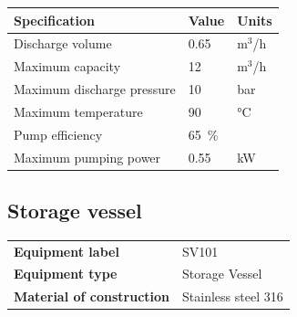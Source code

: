 \begin{table}[H]
\centering
\begin{tabular}{@{}l|l|l@{}}
\toprule
\textbf{Specification}                    & \textbf{Value} & \textbf{Units} \\ \midrule
Discharge volume                              & 0.65            & m$^3$/h            \\ \midrule
Maximum capacity                  & 12       &  m$^3$/h       \\ \midrule
Maximum discharge pressure       & 10         &     bar           \\ \midrule
Maximum temperature                  & 90     & °C         \\ \midrule
Pump efficiency \cite{pumps_and_systems_magazine_pump_2012}               & \SI{65}{\percent}         &            \\ \midrule
Maximum pumping power                     & 0.55     & kW           \\ \bottomrule
\end{tabular}
\end{table}

\newpage
\subsection{Storage vessel}
\begin{table}[H]
    \centering
    \begin{tabular}{@{}l|l@{}}
    \toprule
      \textbf{Equipment label}  & SV101\\
       \textbf{Equipment type}  & Storage Vessel \\
       \textbf{Material of construction} & Stainless steel 316 \\
       \bottomrule
    \end{tabular}
\end{table}


